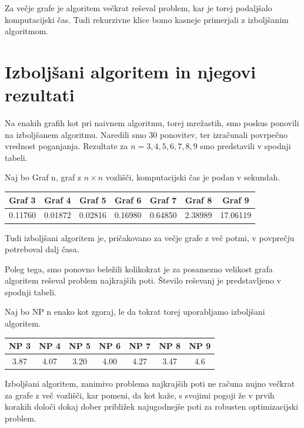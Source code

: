 \documentclass[a4paper, 12 pt]{article}
\theoremstyle{definition} %
\theoremstyle{plain} %
\theoremstyle{definition}
\begin{document}
Za večje grafe je algoritem večkrat reševal problem, kar je torej podaljšalo komputacijski čas. Tudi rekurzivne klice bomo kasneje primerjali z izboljšanim algoritmom.


\section{Izboljšani algoritem in njegovi rezultati}

Na enakih grafih kot pri naivnem algoritmu, torej mrežastih, smo poskus ponovili na izboljšanem algoritmu. Naredili smo 30 ponovitev, ter izračunali povrpečno vrednost poganjanja. Rezultate za $ n = 3,4,5,6,7,8,9$ smo predstavili v spodnji tabeli.


Naj bo Graf n, graf z $n \times n$ vozlišči, komputacijski čas je podan v sekundah.
\begin{center}
 \begin{tabular}{||c c c c c c c||} 
 \hline
Graf 3 & Graf 4 & Graf 5 & Graf 6 & Graf 7 & Graf 8 & Graf 9 \\ 
 \hline
\hline
0.11760 & 0.01872 & 0.02816 & 0.16980 & 0.64850 & 2.38989 & 17.06119\\
 \hline
\end{tabular}
\end{center}

Tudi izboljšani algoritem je, pričakovano za večje grafe z več potmi, v povprečju potreboval dalj časa.\newline


Poleg tega, smo ponovno beležili kolikokrat je za posamezno velikost grafa algoritem reševal problem najkrajših poti. Število reševanj je predstavljeno v spodnji tabeli.


Naj bo NP n enako kot zgoraj, le da tokrat torej uporabljamo izboljšani algoritem. 
\begin{center}
 \begin{tabular}{||c c c c c c c||} 
 \hline
 NP 3 &  NP 4 &  NP 5 &  NP 6 &  NP 7 &  NP 8 &  NP 9 \\ 
 \hline
\hline
3.87 & 4.07 & 3.20 & 4.00 & 4.27 & 3.47 & 4.6 \\ 
 \hline
\end{tabular}
\end{center}

Izboljšani algoritem, zanimivo problema najkrajših poti ne računa nujno večkrat za grafe z več vozlišči, kar pomeni, da kot kaže, s svojimi pogoji že v prvih korakih določi dokaj dober približek najugodnejše poti za robusten optimizacijski problem. 
\end{document}
